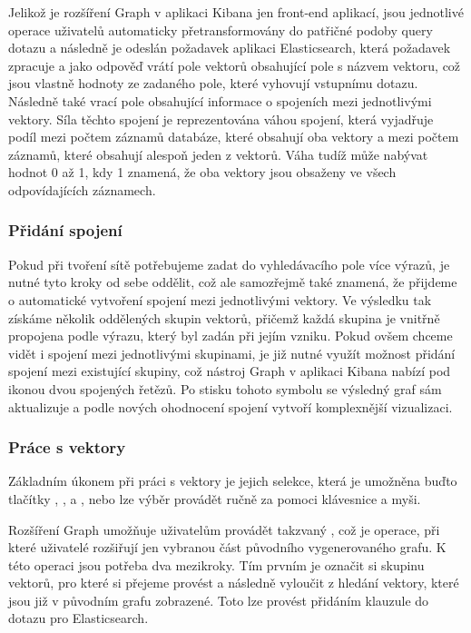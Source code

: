 \documentclass[czech,BP]{thesiskiv}
\begin{document}
Jelikož je rozšíření Graph v aplikaci Kibana jen front-end aplikací, jsou jednotlivé operace uživatelů automaticky přetransformovány do patřičné podoby query dotazu a následně je odeslán požadavek aplikaci Elasticsearch, která požadavek zpracuje a jako odpověď vrátí pole vektorů obsahující pole s názvem vektoru, což jsou vlastně hodnoty ze zadaného pole, které vyhovují vstupnímu dotazu. Následně také vrací pole obsahující informace o spojeních mezi jednotlivými vektory. Síla těchto spojení je reprezentována váhou spojení, která vyjadřuje podíl mezi počtem záznamů databáze, které obsahují oba vektory a mezi počtem záznamů, které obsahují alespoň jeden z vektorů. Váha tudíž může nabývat hodnot 0 až 1,  kdy 1 znamená, že oba vektory jsou obsaženy ve všech odpovídajících záznamech.

\subsubsection{Přidání spojení}
Pokud při tvoření sítě potřebujeme zadat do vyhledávacího pole více výrazů, je nutné tyto kroky od sebe oddělit, což ale samozřejmě také znamená, že přijdeme o automatické vytvoření spojení mezi jednotlivými vektory. Ve výsledku tak získáme několik oddělených skupin vektorů, přičemž každá skupina je vnitřně propojena podle výrazu, který byl zadán při jejím vzniku. Pokud ovšem chceme vidět i spojení mezi jednotlivými skupinami, je již nutné využít možnost přidání spojení mezi existující skupiny, což nástroj Graph v aplikaci Kibana nabízí pod ikonou dvou spojených řetězů. Po stisku tohoto symbolu se výsledný graf sám aktualizuje a podle nových ohodnocení spojení vytvoří komplexnější vizualizaci.

\subsubsection{Práce s vektory}
Základním úkonem při práci s vektory je jejich selekce, která je umožněna buďto tlačítky , ,  a , nebo lze výběr provádět ručně za pomoci klávesnice  a myši.


Rozšíření Graph umožňuje uživatelům provádět takzvaný , což je operace, při které uživatelé rozšiřují jen vybranou část původního vygenerovaného grafu. K této operaci jsou potřeba dva mezikroky. Tím prvním je označit si skupinu vektorů, pro které si přejeme provést  a následně vyloučit z hledání vektory, které jsou již v původním grafu zobrazené. Toto lze provést přidáním klauzule  do dotazu pro Elasticsearch. \cite{Spidering} 
\end{document}
